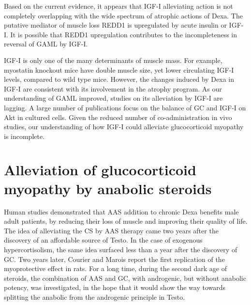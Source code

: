\documentclass[12pt,english]{report}\usepackage[]{graphicx}\usepackage[]{color}
\begin{document}
Based on the current evidence, it appears that IGF-I alleviating action
is not completely overlapping with the wide spectrum of atrophic actions
of Dexa. The putative mediator of muscle loss REDD1 is upregulated
by acute insulin or IGF-I\citep{frost2009regulation}. It is possible
that REDD1 upregulation contributes to the incompleteness in reversal
of GAML by IGF-I.

IGF-I is only one of the many determinants of muscle mass. For example,
myostatin knockout mice have double muscle size, yet lower circulating
IGF-I levels, compared to wild type mice\citep{williams2011endocrine}.
However, the changes induced by Dexa in IGF-I are consistent with
its involvement in the atrophy program. As our understanding of GAML
improved, studies on its alleviation by IGF-I are lagging. A large
number of publications focus on the balance of GC and IGF-I on Akt
in cultured cells. Given the reduced number of co-administration in
vivo studies, our understanding of how IGF-I could alleviate glucocorticoid
myopathy is incomplete.


\section{Alleviation of glucocorticoid myopathy by anabolic steroids}

Human studies demonstrated that AAS addition to chronic Dexa benefits
male adult patients, by reducing their loss of muscle and improving
their quality of life\citep{crawford2003randomized}. The idea of
alleviating the CS by AAS therapy came two years after the discovery
of an affordable source of Testo. In the case of exogenous hypercortisolism,
the same idea surfaced less than a year after the discovery of GC.
Two years later, Courier and Marois report the first replication of
the myoprotective effect in rats\citep{courrier1952relations}. For
a long time, during the second dark age of steroids, the combination
of AAS and GC, with androgenic, but without anabolic potency, was
investigated, in the hope that it would show the way towards splitting
the anabolic from the androgenic principle in Testo.
\end{document}
